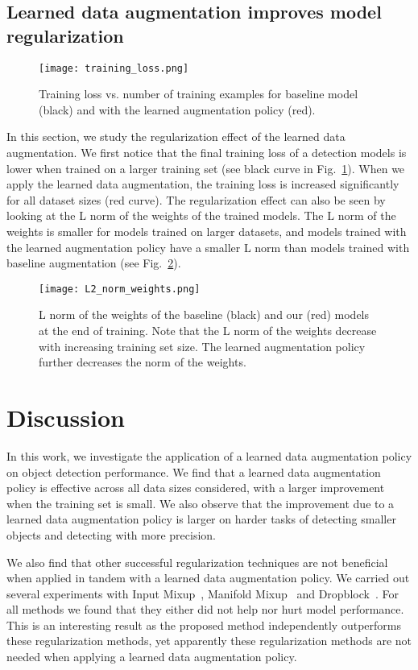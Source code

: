 \documentclass[10pt,twocolumn,letterpaper]{article}
\begin{document}
\subsection{Learned data augmentation improves model regularization}
\begin{figure}[h!]
\centering
\texttt{[image: training\_loss.png]}
\caption{Training loss vs. number of training examples for baseline model (black) and with the learned augmentation policy (red).  
}
\label{fig:training_loss}
\end{figure}


In this section, we study the regularization effect of the learned data augmentation. We first notice that the final training loss of a detection models is lower when trained on a larger training set (see black curve in Fig.~\ref{fig:training_loss}). When we apply the learned data augmentation, the training loss is increased significantly for all dataset sizes (red curve). The  regularization effect can also be seen by looking at the L norm of the weights of the trained models. The L norm of the weights is smaller for models trained on larger datasets, and models trained with the learned augmentation policy have a smaller L norm than models trained with baseline augmentation (see Fig.~\ref{fig:l2_norm}). 

\begin{figure}[h!]
\centering
\texttt{[image: L2\_norm\_weights.png]}
\caption{L norm of the weights of the baseline (black) and our (red) models at the end of training. Note that the L norm of the weights decrease with increasing training set size. The learned augmentation policy further decreases the norm of the weights.  
}
\label{fig:l2_norm}
\end{figure} \section{Discussion}
In this work, we investigate the application of a learned data augmentation policy on object detection performance. We find that a learned data augmentation policy is effective across all data sizes considered, with a larger improvement when the training set is small. We also observe that the improvement due to a learned data augmentation policy is larger on harder tasks of detecting smaller objects and detecting with more precision. 

We also find that other successful regularization techniques are not beneficial when applied in tandem with a learned data augmentation policy. We carried out several experiments with Input Mixup~\cite{zhang2017mixup}, Manifold Mixup~\cite{verma2018manifold} and Dropblock~\cite{ghiasi2018dropblock}. For all methods we found that they either did not help nor hurt model performance. This is an interesting result as the proposed method independently outperforms these regularization methods, yet apparently these regularization methods are not needed when applying a learned data augmentation policy.
\end{document}
